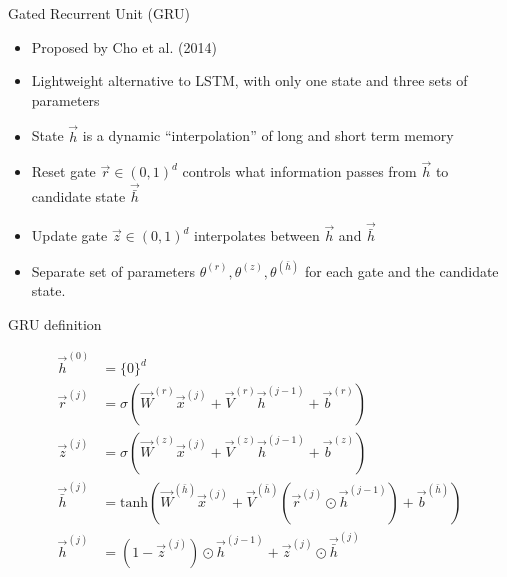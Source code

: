 
\begin{vbframe}{Gated Recurrent Unit (GRU)}

\vfill

\begin{itemize}
	\item Proposed by Cho et al. (2014)
	\item Lightweight alternative to LSTM, with only one state and three sets of parameters
	\item State $\vec h$ is a dynamic ``interpolation'' of long and short term memory
	\item Reset gate $\vec r \in (0,1)^d$ controls what information passes from $\vec h$ to candidate state $\vec {\bar{h}}$
	\item Update gate $\vec z \in (0,1)^d$ interpolates between $\vec h$ and $\vec {\bar{h}}$
	\item Separate set of parameters $\theta^{(r)}, \theta^{(z)}, \theta^{(\bar{h})}$ for each gate and the candidate state.
\end{itemize}

\vfill

\end{vbframe}


\begin{vbframe}{GRU definition}

\vfill

$$
\begin{aligned}
\vec h^{(0)} & = \{0\}^d \\
\vec r^{(j)} & = \sigma(\vec W^{(r)} \vec x^{(j)} + \vec V^{(r)} \vec h^{(j-1)} + \vec b^{(r)}) \\
\vec z^{(j)} & = \sigma(\vec W^{(z)} \vec x^{(j)} + \vec V^{(z)} \vec h^{(j-1)} + \vec b^{(z)}) \\
\vec {\bar{h}}^{(j)} & = \mathrm{tanh}(\vec W^{(\bar{h})} \vec x^{(j)} + \vec V^{(\bar{h})} (\vec r^{(j)} \odot \vec h^{(j-1)}) + \vec b^{(\bar{h})}) \\
\vec h^{(j)} &= (1-\vec z^{(j)}) \odot \vec h^{(j-1)} + \vec z^{(j)} \odot \vec {\bar{h}}^{(j)} \\
\end{aligned}
$$

\vfill

\end{vbframe}

